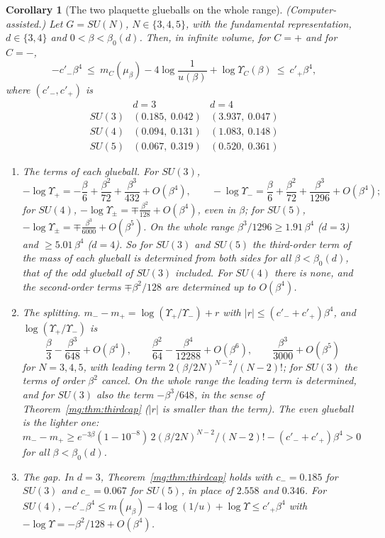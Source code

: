 \documentclass[11pt,a4paper]{article}
\newtheorem{corollary}[theorem]{Corollary}
\theoremstyle{definition}
\theoremstyle{remark}
\begin{document}
\begin{corollary}[The two plaquette glueballs on the whole range]\label{mg:cor:sectorscap}
(Computer-assisted.) Let $G=SU(N)$, $N\in\{3,4,5\}$, with the fundamental representation, $d\in\{3,4\}$ and $0<\beta<\beta_0(d)$. Then, in infinite volume, for $C=+$ and for $C=-$,
\[
-c'_-\beta^4\ \le\ m_C(\mu_\beta)-4\log\frac1{u(\beta)}+\log\Upsilon_C(\beta)\ \le\ c'_+\beta^4,
\]
where $(c'_-,c'_+)$ is
\[
\begin{array}{lcc}
 & d=3 & d=4\\
SU(3) & (0.185,\ 0.042) & (3.937,\ 0.047)\\
SU(4) & (0.094,\ 0.131) & (1.083,\ 0.148)\\
SU(5) & (0.067,\ 0.319) & (0.520,\ 0.361)
\end{array}
\]
\begin{enumerate}[label=(\roman*)]
\item \emph{The terms of each glueball.} For $SU(3)$,
\[
-\log\Upsilon_+=-\frac\beta6+\frac{\beta^2}{72}+\frac{\beta^3}{432}+O(\beta^4),\qquad-\log\Upsilon_-=\frac\beta6+\frac{\beta^2}{72}+\frac{\beta^3}{1296}+O(\beta^4);
\]
for $SU(4)$, $-\log\Upsilon_\pm=\mp\frac{\beta^2}{128}+O(\beta^4)$, even in $\beta$; for $SU(5)$, $-\log\Upsilon_\pm=\mp\frac{\beta^3}{6000}+O(\beta^5)$. On the whole range $\beta^3/1296\ge1.91\,\beta^4$
($d=3$) and $\ge5.01\,\beta^4$ ($d=4$). So for $SU(3)$ and $SU(5)$ the third-order term of the mass of each glueball is determined from both sides for all $\beta<\beta_0(d)$, that of the odd
glueball of $SU(3)$ included. For $SU(4)$ there is none, and the second-order terms $\mp\beta^2/128$ are determined up to $O(\beta^4)$.
\item \emph{The splitting.} $m_--m_+=\log(\Upsilon_+/\Upsilon_-)+r$ with $|r|\le(c'_-+c'_+)\beta^4$, and $\log(\Upsilon_+/\Upsilon_-)$ is
\[
\frac\beta3-\frac{\beta^3}{648}+O(\beta^4),\qquad\frac{\beta^2}{64}-\frac{\beta^4}{12288}+O(\beta^6),\qquad\frac{\beta^3}{3000}+O(\beta^5)
\]
for $N=3,4,5$, with leading term $2(\beta/2N)^{N-2}/(N-2)!$; for $SU(3)$ the terms of order $\beta^2$ cancel. On the whole range the leading term is determined, and for $SU(3)$ also the term
$-\beta^3/648$, in the sense of Theorem~\ref{mg:thm:thirdcap} ($|r|$ is smaller than the term). The even glueball is the lighter one:
$m_--m_+\ge e^{-3\beta}(1-10^{-8})\,2(\beta/2N)^{N-2}/(N-2)!-(c'_-+c'_+)\beta^4>0$ for all $\beta<\beta_0(d)$.
\item \emph{The gap.} In $d=3$, Theorem~\ref{mg:thm:thirdcap} holds with $c_-=0.185$ for $SU(3)$ and $c_-=0.067$ for $SU(5)$, in place of $2.558$ and $0.346$. For $SU(4)$,
$-c'_-\beta^4\le m(\mu_\beta)-4\log(1/u)+\log\Upsilon\le c'_+\beta^4$ with $-\log\Upsilon=-\beta^2/128+O(\beta^4)$.
\end{enumerate}
\end{corollary}
\end{document}
